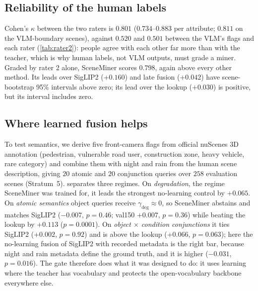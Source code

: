 \documentclass[10pt,twocolumn,letterpaper]{article}
\newcommand{\gdeg}{\gamma_{\mathrm{deg}}}
\begin{document}
\begin{table}[t]\centering\small
\caption{\textbf{A second human rater} on $160$ of the $550$ scenes ($20$ rater-1
positives and $20$ scenes with the VLM margin closest to zero, per attribute).
Cohen's $\kappa$ between the raters and between the VLM's flags and each rater; mAP
graded by rater 2 alone. $^{\ast}$Late fusion of SigLIP2 and the lookup.}
\label{tab:rater2}
\resizebox{\columnwidth}{!}{%
\setlength{\tabcolsep}{4pt}}
\end{table}

\subsection{Reliability of the human labels}
Cohen's $\kappa$ between the two raters is $0.801$ ($0.734$--$0.883$ per attribute;
$0.811$ on the VLM-boundary scenes), against $0.520$ and $0.501$ between the VLM's
flags and each rater (\cref{tab:rater2}): people agree with each other far more than
with the teacher, which is why human labels, not VLM outputs, must grade a miner.
Graded by rater 2 alone, SceneMiner scores $0.798$, again above every other method.
Its leads over SigLIP2 ($+0.160$) and late fusion ($+0.042$) have scene-bootstrap
95\% intervals above zero; its lead over the lookup ($+0.030$) is positive, but its
interval includes zero.

\subsection{Where learned fusion helps}
\label{sec:regimes}
To test semantics, we derive five front-camera flags from official nuScenes 3D
annotation (pedestrian, vulnerable road user, construction zone, heavy vehicle,
rare category) and combine them with night and rain from the human scene
description, giving $20$ atomic and $20$ conjunction queries over $258$ evaluation
scenes (Stratum~5).  separates three regimes. On \emph{degradation},
the regime SceneMiner was trained for, it leads the strongest no-learning control by
$+0.065$. On \emph{atomic semantics} object queries receive $\gdeg\approx0$, so
SceneMiner abstains and matches SigLIP2 ($-0.007$, $p=0.46$; val150 $+0.007$,
$p=0.36$) while beating the lookup by $+0.113$ ($p=0.0001$). On \emph{object $\times$
condition conjunctions} it ties SigLIP2 ($+0.002$, $p=0.92$) and is above the
lookup ($+0.066$, $p=0.063$); here the no-learning fusion of SigLIP2 with recorded metadata is the
right bar, because night and rain metadata define the ground truth, and it is higher
($-0.031$, $p=0.016$). The gate therefore does what it was designed to do: it uses
learning where the teacher has vocabulary and protects the open-vocabulary backbone
everywhere else.
\end{document}
